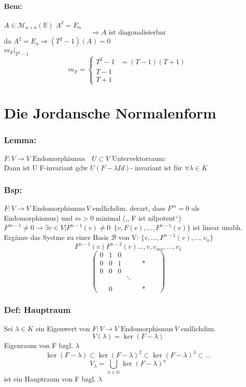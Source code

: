 \documentclass[titlepage,12pt,a4paper,ngerman]{report}
\newcommand{\tx}[1]{\textrm{#1}}
\newcommand{\enph}{F: V \to V \textrm{ Endomorphismus}}
\begin{document}
\subsubsection{Bem:} $A\in \mathcal{M}_{n \times n} (\mathbb{R})$
$ A^2 = E_n$
$$\Rightarrow A \tx{ ist diagonalisierbar}$$
da $A^2 = E_n \Rightarrow (T^2-1) (A) = 0$\\
$m_F | _{T^2-1}$
$$ m_F = \left\{ \begin{array}{ll}
T^2-1 & = (T-1)(T+1) \\
T-1 \\
T+1
\end{array} \right.$$

\chapter{Die Jordansche Normalenform}
\subsection{Lemma:}
$\enph \quad U \subset V$ Untervektorraum:\\
Dann ist U F-invariant gdw
$ U(F-\lambda Id)$- invariant ist für $ \forall \lambda \in K$
\subsection{Bsp:}
$\enph \ V$ endlichdim. derart, dass 
$F^m = 0$ als Endomorphismus) und $m>0$ minimal (,, F ist nilpotent``)\\
$ F^{m-1} \neq 0 \rightarrow \exists v \in V | F^{n-1}(v) \neq 0$\
$\{v,F(v),\dots,F^{n-1}(v)\}$ ist linear unabh.\\
Ergänze das Systme zu einer Basis $\mathcal{B}$ von V: $\{v, \dots , F^{n-1}(v), \dots , v_n\}$
$$F^{n-1}(v) F^{n-2}(v) \dots, v, v_{mn} , \dots , v_1$$
$$\begin{pmatrix}
0 & 1 & 0 & \\
0 & 0 & 1 & & & * & & \\
0 & 0 & 0 & \\
&&& \ddots\\ 
\\
& 0 & & & & *
\end{pmatrix}$$

\subsection{Def: Hauptraum}
Sei $\lambda \in K$ ein Eigenwert von $\enph \ V$ endlichdim.
$$ V(\lambda) = \ker ( F-\lambda )$$
Eigenraum von F bzgl. $\lambda$
$$ \ker(F-\lambda) \subset \ker(F-\lambda)^2 \subset \ker(F-\lambda)^3 \subset \dots$$
$$V_\lambda = \bigcup_{n\in \mathbb{N}} \ker(F-\lambda)^n$$
ist ein Hauptraum von F bzgl. $\lambda$
\end{document}
